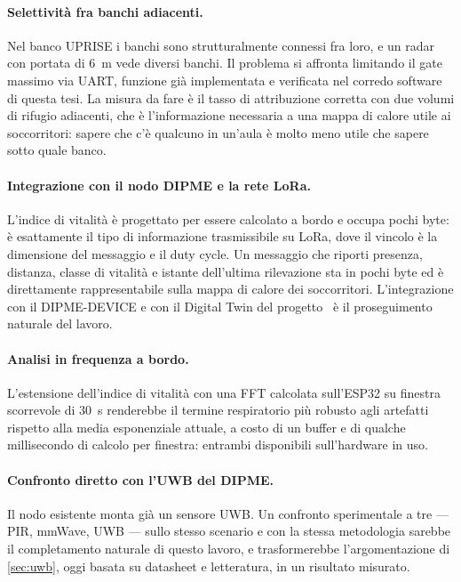 \paragraph{Selettività fra banchi adiacenti.} Nel banco UPRISE i banchi sono
strutturalmente connessi fra loro, e un radar con portata di 6~m vede diversi banchi.
Il problema si affronta limitando il gate massimo via UART, funzione già
implementata e verificata nel corredo software di questa tesi. La misura da fare è
il tasso di attribuzione corretta con due volumi di rifugio adiacenti, che è
l'informazione necessaria a una mappa di calore utile ai soccorritori: sapere che
c'è qualcuno in un'aula è molto meno utile che sapere sotto quale banco.

\paragraph{Integrazione con il nodo DIPME e la rete LoRa.} L'indice di vitalità è
progettato per essere calcolato a bordo e occupa pochi byte: è esattamente il tipo di
informazione trasmissibile su LoRa, dove il vincolo è la dimensione del messaggio e
il duty cycle. Un messaggio che riporti presenza, distanza, classe di vitalità e
istante dell'ultima rilevazione sta in pochi byte ed è direttamente rappresentabile
sulla mappa di calore dei soccorritori. L'integrazione con il DIPME-DEVICE e con il
Digital Twin del progetto~\cite{callisto2023dt} è il proseguimento naturale del
lavoro.

\paragraph{Analisi in frequenza a bordo.} L'estensione dell'indice di vitalità con
una FFT calcolata sull'ESP32 su finestra scorrevole di 30~s renderebbe il termine
respiratorio più robusto agli artefatti rispetto alla media esponenziale attuale, a
costo di un buffer e di qualche millisecondo di calcolo per finestra: entrambi
disponibili sull'hardware in uso.

\paragraph{Confronto diretto con l'UWB del DIPME.} Il nodo esistente monta già un
sensore UWB. Un confronto sperimentale a tre --- PIR, mmWave, UWB --- sullo stesso
scenario e con la stessa metodologia sarebbe il completamento naturale di questo
lavoro, e trasformerebbe l'argomentazione di \cref{sec:uwb}, oggi basata su
datasheet e letteratura, in un risultato misurato.
